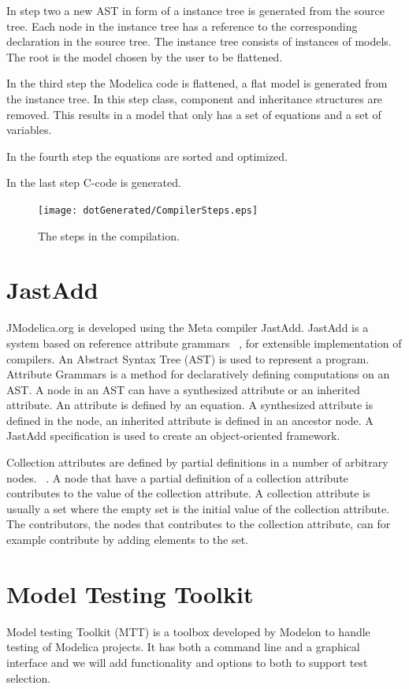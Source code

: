 \documentclass{cslthse-msc}
\begin{document}
In step two a new AST in form of a instance tree is generated from the source tree. Each node in the instance tree has a reference to the corresponding declaration in the source tree. The instance tree consists of instances of models. The root is the model chosen by the user to be flattened.

In the third step the Modelica code is flattened, a flat model is generated from the instance tree. In this step class, component and inheritance structures are removed. This results in a model that only has a set of equations and a set of variables.

In the fourth step the equations are sorted and optimized.

In the last step C-code is generated.

\begin{figure}[!htbp]
    \centering
    {\texttt{[image: dotGenerated/CompilerSteps.eps]}}
    \caption{The steps in the compilation.}
    \label{fig:compilerSteps}
\end{figure}

\section{JastAdd}
JModelica.org is developed using the Meta compiler JastAdd. JastAdd is a system based on reference attribute grammars ~\cite{aakesson2010implementation}, for extensible implementation of compilers. An Abstract Syntax Tree (AST) is used to represent a program. Attribute Grammars is a method for declaratively defining computations on an AST. A node in an AST can have a synthesized attribute or an inherited attribute. An attribute is defined by an equation. A synthesized attribute is defined in the node, an inherited attribute is defined in an ancestor node. A JastAdd specification is used to create an object-oriented framework.

Collection attributes are defined by partial definitions in a number of arbitrary nodes. ~\cite{magnusson2007extending}. A node that have a partial definition of a collection attribute contributes to the value of the collection attribute. A collection attribute is usually a set where the empty set is the initial value of the collection attribute. The contributors, the nodes that contributes to the collection attribute, can for example contribute by adding elements to the set.

\section{Model Testing Toolkit}
Model testing Toolkit (MTT) is a toolbox developed by Modelon to handle testing of Modelica projects. It has both a command line and a graphical interface and we will add functionality and options to both to support test selection.
\end{document}
